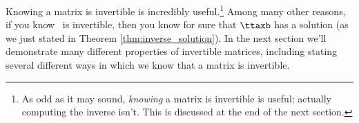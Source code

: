 \medskip


Knowing a matrix is invertible is incredibly useful.\footnote{As odd as it may sound, \textit{knowing} a matrix is invertible is useful; actually computing the inverse isn't. This is discussed at the end of the next section.} Among many other reasons, if you know \tta\ is invertible, then you know for sure that $\ttaxb$ has a solution (as we just stated in Theorem \ref{thm:inverse_solution}). In the next section we'll demonstrate many different properties of invertible matrices, including stating several different ways in which we know that a matrix is invertible.




